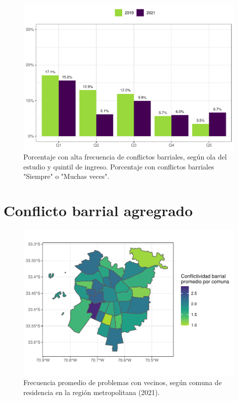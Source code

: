 \documentclass[
  12pt,
  openany]{book}
\begin{document}
\begin{figure}

{\centering \includegraphics{reporte-elsoc_files/figure-latex/confli-quintil-1} 

}

\caption{Porcentaje con alta frecuencia de conflictos barriales, según ola del estudio y quintil de ingreso. Porcentaje con conflictos barriales "Siempre" o "Muchas veces".}\label{fig:confli-quintil}
\end{figure}

\hypertarget{conflicto-barrial-agregrado}{%
\section{Conflicto barrial agregrado}\label{conflicto-barrial-agregrado}}

\begin{figure}

{\centering \includegraphics{reporte-elsoc_files/figure-latex/confli-comuna-1} 

}

\caption{Frecuencia promedio de problemas con vecinos, según comuna de residencia en la región metropolitana (2021).}\label{fig:confli-comuna}
\end{figure}
\end{document}
